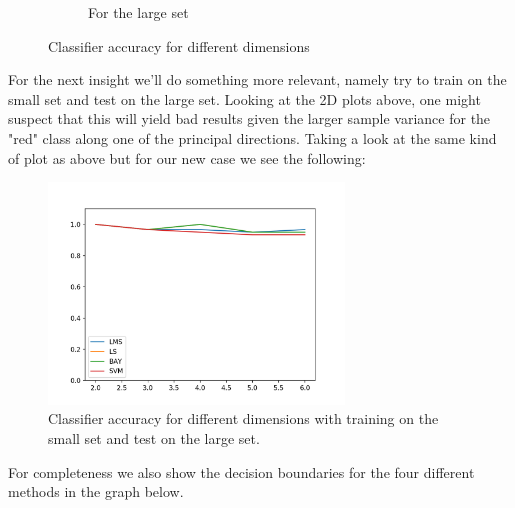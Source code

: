 \documentclass[12pt, a4paper]{article}
\begin{document}
\begin{figure}[H]
\begin{subfigure}{0.45\textwidth}
        \caption{ For the large set }
    \end{subfigure}
     \caption{Classifier accuracy for different dimensions}
\end{figure}

For the next insight we'll do something more relevant, namely try to train on the small set and test on the large set. Looking at the 2D plots above, one might suspect that this will yield bad results given the larger sample variance for the "red" class along one of the principal directions. Taking a look at the same kind of plot as above but for our new case we see the following:


\begin{figure}[H]
    \centering
    \includegraphics[width=0.7\textwidth]{recursos/3/dim_small_vs_large}
    \caption{Classifier accuracy for different dimensions with training on the small set and test on the large set.}
\end{figure}

For completeness we also show the decision boundaries for the four different methods in the graph below.
\end{document}
